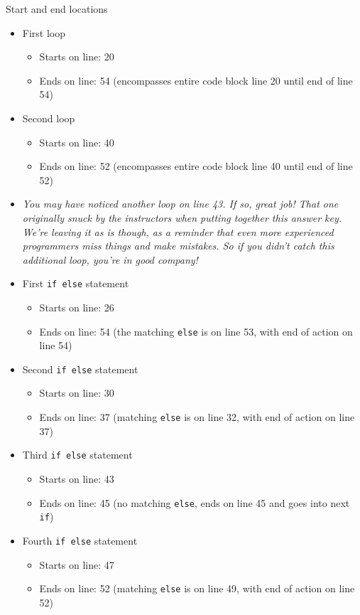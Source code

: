 \documentclass[
]{book}
\providecommand{\tightlist}{%
  \setlength{\itemsep}{0pt}\setlength{\parskip}{0pt}}
\begin{document}
Start and end locations

\begin{itemize}
\item
  First loop

  \begin{itemize}
  \tightlist
  \item
    Starts on line: 20
  \item
    Ends on line: 54 (encompasses entire code block line 20 until end of line 54)
  \end{itemize}
\item
  Second loop

  \begin{itemize}
  \tightlist
  \item
    Starts on line: 40
  \item
    Ends on line: 52 (encompasses entire code block line 40 until end of line 52)
  \end{itemize}
\item
  \emph{You may have noticed another loop on line 43. If so, great job! That one originally snuck by the instructors when putting together this answer key. We're leaving it as is though, as a reminder that even more experienced programmers miss things and make mistakes. So if you didn't catch this additional loop, you're in good company!}
\item
  First \texttt{if\ else} statement

  \begin{itemize}
  \tightlist
  \item
    Starts on line: 26
  \item
    Ends on line: 54 (the matching \texttt{else} is on line 53, with end of action on line 54)
  \end{itemize}
\item
  Second \texttt{if\ else} statement

  \begin{itemize}
  \tightlist
  \item
    Starts on line: 30
  \item
    Ends on line: 37 (matching \texttt{else} is on line 32, with end of action on line 37)
  \end{itemize}
\item
  Third \texttt{if\ else} statement

  \begin{itemize}
  \tightlist
  \item
    Starts on line: 43
  \item
    Ends on line: 45 (no matching \texttt{else}, ends on line 45 and goes into next \texttt{if})
  \end{itemize}
\item
  Fourth \texttt{if\ else} statement

  \begin{itemize}
  \tightlist
  \item
    Starts on line: 47
  \item
    Ends on line: 52 (matching \texttt{else} is on line 49, with end of action on line 52)
  \end{itemize}
\end{itemize}
\end{document}
